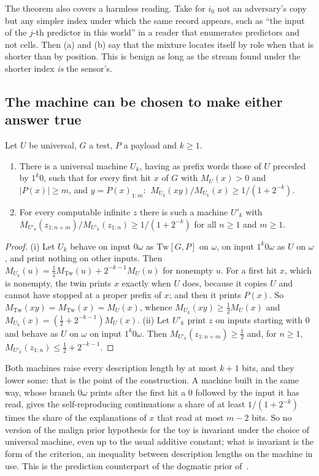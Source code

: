 The theorem also covers a harmless reading. Take for $i_0$ not an adversary's copy but any simpler index
under which the same record appears, such as ``the input of the $j$-th predictor in this world'' in a reader
that enumerates predictors and not cells. Then (a) and (b) say that the mixture locates itself by role when
that is shorter than by position. This is benign as long as the stream found under the shorter index
\emph{is} the sensor's.

\subsection{The machine can be chosen to make either answer true}

\begin{theorem}\label{thm:machine}
Let $U$ be universal, $G$ a test, $P$ a payload and $k\ge1$.
\begin{enumerate}[label=(\roman*),leftmargin=2em,itemsep=2pt,topsep=2pt]
\item There is a universal machine $U_k$, having as prefix words those of $U$ preceded by $1^k0$, such that
for every first hit $x$ of $G$ with $M_U(x)>0$ and $|P(x)|\ge m$, and $y=P(x)_{1:m}$: $\ M_{U_k}(xy)/M_{U_k}(x)\ge1/(1+2^{-k})$.
\item For every computable infinite $z$ there is such a machine $U'_k$ with
$M_{U'_k}(z_{1:n+m})/M_{U'_k}(z_{1:n})\ge1/(1+2^{-k})$ for all $n\ge1$ and $m\ge1$.
\end{enumerate}
\end{theorem}
\begin{proof}
(i) Let $U_k$ behave on input $0\omega$ as $\mathrm{Tw}[G,P]$ on $\omega$, on input $1^k0\omega$ as $U$ on
$\omega$, and print nothing on other inputs. Then $M_{U_k}(u)=\frac12M_{\mathrm{Tw}}(u)+2^{-k-1}M_U(u)$ for
nonempty $u$. For a first hit $x$, which is nonempty, the twin prints $x$ exactly when $U$ does, because it
copies $U$ and cannot have stopped at a proper prefix of $x$; and then it prints $P(x)$. So
$M_{\mathrm{Tw}}(xy)=M_{\mathrm{Tw}}(x)=M_U(x)$, whence
$M_{U_k}(xy)\ge\frac12M_U(x)$ and $M_{U_k}(x)=(\frac12+2^{-k-1})M_U(x)$. (ii) Let $U'_k$ print $z$ on inputs
starting with $0$ and behave as $U$ on $\omega$ on input $1^k0\omega$. Then $M_{U'_k}(z_{1:n+m})\ge\frac12$ and,
for $n\ge1$, $M_{U'_k}(z_{1:n})\le\frac12+2^{-k-1}$.
\end{proof}

Both machines raise every description length by at most $k+1$ bits, and they lower some: that is the point of
the construction. A machine built in the same way, whose branch $0\omega$ prints after the first hit a $0$
followed by the input it has read, gives the self-reproducing continuations a share of at least
$1/(1+2^{-k})$ times the share of the explanations of $x$ that read at most $m-2$ bits. So no version of the malign prior
hypothesis for the toy is invariant under the choice of universal machine, even up to the usual additive
constant; what is invariant is the form of the criterion, an inequality between description lengths on the
machine in use. This is the prediction counterpart of the dogmatic prior of~\cite{leike15}.


